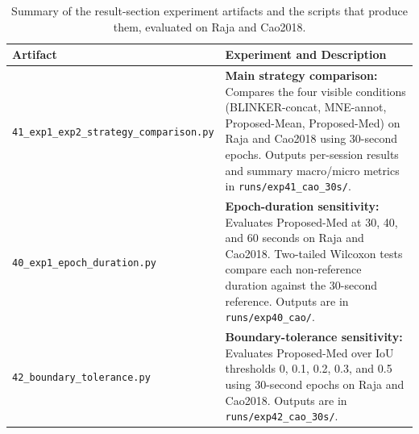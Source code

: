 \begin{table}[h]
    \small
    \centering
    \caption{Summary of the result-section experiment artifacts and the scripts that produce them, evaluated on Raja and Cao2018.}
    \label{tab:exp_overview}
    \begin{tabularx}{\textwidth}{p{3.2cm}X}
\toprule
\textbf{Artifact} & \textbf{Experiment and Description} \\
\midrule
\texttt{41\_exp1\_exp2\_\newline strategy\_\newline comparison.py}
&
\textbf{Main strategy comparison:} Compares the four visible conditions
(BLINKER-concat, MNE-annot, Proposed-Mean, Proposed-Med) on Raja and Cao2018
using 30-second epochs. Outputs per-session results and summary macro/micro
metrics in \texttt{runs/exp41\_cao\_30s/}.
\\
\midrule
\texttt{40\_exp1\_\newline epoch\_\newline duration.py}
&
\textbf{Epoch-duration sensitivity:} Evaluates Proposed-Med at 30, 40, and
60 seconds on Raja and Cao2018. Two-tailed Wilcoxon tests compare each
non-reference duration against the 30-second reference. Outputs are in
\texttt{runs/exp40\_cao/}.
\\
\midrule
\texttt{42\_boundary\_\newline tolerance.py}
&
\textbf{Boundary-tolerance sensitivity:} Evaluates Proposed-Med over IoU
thresholds 0, 0.1, 0.2, 0.3, and 0.5 using 30-second epochs on Raja and
Cao2018. Outputs are in \texttt{runs/exp42\_cao\_30s/}.
\\
\bottomrule
    \end{tabularx}
\end{table}
